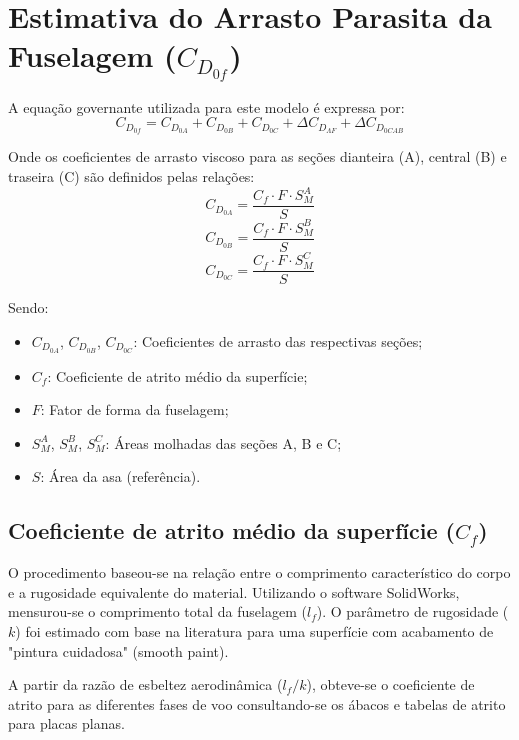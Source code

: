 \section{Estimativa do Arrasto Parasita da Fuselagem ($C_{D_{0f}}$)}

A equação governante utilizada para este modelo é expressa por:
\begin{equation}
    C_{D_{0f}} = C_{D_{0A}} + C_{D_{0B}} + C_{D_{0C}} + \Delta C_{D_{\Lambda F}} + \Delta C_{D_{0CAB}}
\end{equation}

Onde os coeficientes de arrasto viscoso para as seções dianteira (A), central (B) e traseira (C) são definidos pelas relações:
\begin{equation}
    C_{D_{0A}} = \frac{C_f \cdot F \cdot S_M^A}{S}
\end{equation}
\begin{equation}
    C_{D_{0B}} = \frac{C_f \cdot F \cdot S_M^B}{S}
\end{equation}
\begin{equation}
    C_{D_{0C}} = \frac{C_f \cdot F \cdot S_M^C}{S}
\end{equation}

Sendo:
\begin{itemize}
    \item $C_{D_{0A}}$, $C_{D_{0B}}$, $C_{D_{0C}}$: Coeficientes de arrasto das respectivas seções;
    \item $C_f$: Coeficiente de atrito médio da superfície;
    \item $F$: Fator de forma da fuselagem;
    \item $S_M^A$, $S_M^B$, $S_M^C$: Áreas molhadas das seções A, B e C;
    \item $S$: Área da asa (referência).
\end{itemize}

\subsection{Coeficiente de atrito médio da superfície ($C_f$)}

O procedimento baseou-se na relação entre o comprimento característico do corpo e a rugosidade equivalente do material. Utilizando o software SolidWorks, mensurou-se o comprimento total da fuselagem ($l_f$). O parâmetro de rugosidade ($k$) foi estimado com base na literatura para uma superfície com acabamento de "pintura cuidadosa" (smooth paint). 

A partir da razão de esbeltez aerodinâmica ($l_f / k$), obteve-se o coeficiente de atrito para as diferentes fases de voo consultando-se os ábacos e tabelas de atrito para placas planas.

